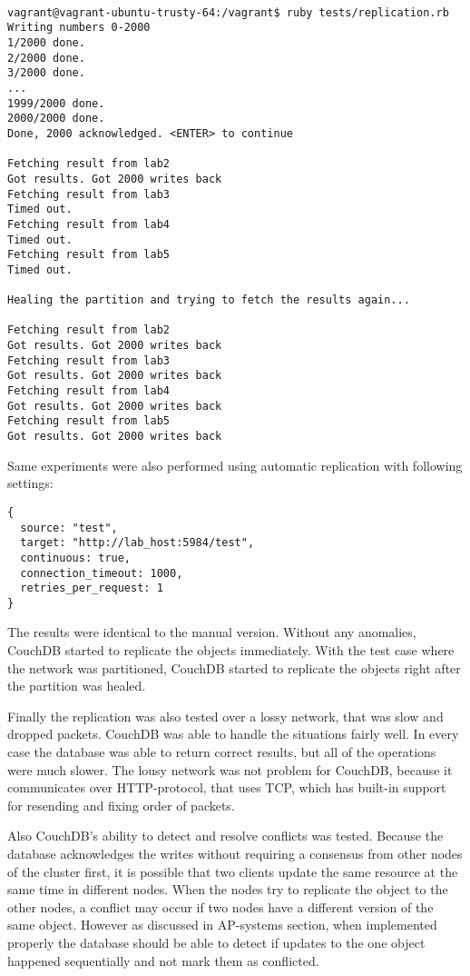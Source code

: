\begin{lstlisting}[caption={CouchDB replication with partitioned
network},label={listing-partition}]

vagrant@vagrant-ubuntu-trusty-64:/vagrant$ ruby tests/replication.rb
Writing numbers 0-2000
1/2000 done.
2/2000 done.
3/2000 done.
...
1999/2000 done.
2000/2000 done.
Done, 2000 acknowledged. <ENTER> to continue

Fetching result from lab2
Got results. Got 2000 writes back
Fetching result from lab3
Timed out.
Fetching result from lab4
Timed out.
Fetching result from lab5
Timed out.

Healing the partition and trying to fetch the results again...

Fetching result from lab2
Got results. Got 2000 writes back
Fetching result from lab3
Got results. Got 2000 writes back
Fetching result from lab4
Got results. Got 2000 writes back
Fetching result from lab5
Got results. Got 2000 writes back
\end{lstlisting}

Same experiments were also performed using automatic replication with following
settings:

\begin{verbatim}
{
  source: "test",
  target: "http://lab_host:5984/test",
  continuous: true,
  connection_timeout: 1000,
  retries_per_request: 1
}
\end{verbatim}

The results were identical to the manual version. Without any anomalies, CouchDB
started to replicate the objects immediately. With the test case where the
network was partitioned, CouchDB started to replicate the objects right after
the partition was healed.

Finally the replication was also tested over a lossy network, that was slow and
dropped packets. CouchDB was able to handle the situations fairly well. In every
case the database was able to return correct results, but all of the operations
were much slower. The lousy network was not problem for CouchDB, because it
communicates over HTTP-protocol, that uses TCP, which has built-in support for
resending and fixing order of packets.

Also CouchDB's ability to detect and resolve conflicts was tested. Because
the database acknowledges the writes without requiring a consensus from other
nodes of the cluster first, it is possible that two clients update the same
resource at the same time in different nodes. When the nodes try to replicate
the object to the other nodes, a conflict may occur if two nodes have a
different version of the same object. However as discussed in AP-systems
section, when implemented properly the database should be able to detect if
updates to the one object happened sequentially and not mark them as conflicted.

